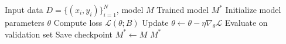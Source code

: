 \begin{algorithm}[t]
  \caption{Example Algorithm}
  \label{alg:example}
  \begin{algorithmic}[1]
    \Require Input data $D = \{(x_i, y_i)\}_{i=1}^{N}$, model $M$
    \Ensure Trained model $M^*$
    \State Initialize model parameters $\theta$
        \State Compute loss $\mathcal{L}(\theta; B)$
        \State Update $\theta \leftarrow \theta - \eta \nabla_\theta \mathcal{L}$
      \EndFor
      \State Evaluate on validation set
        \State Save checkpoint $M^* \leftarrow M$
      \EndIf
    \EndFor
    \State \Return $M^*$
  \end{algorithmic}
\end{algorithm}
